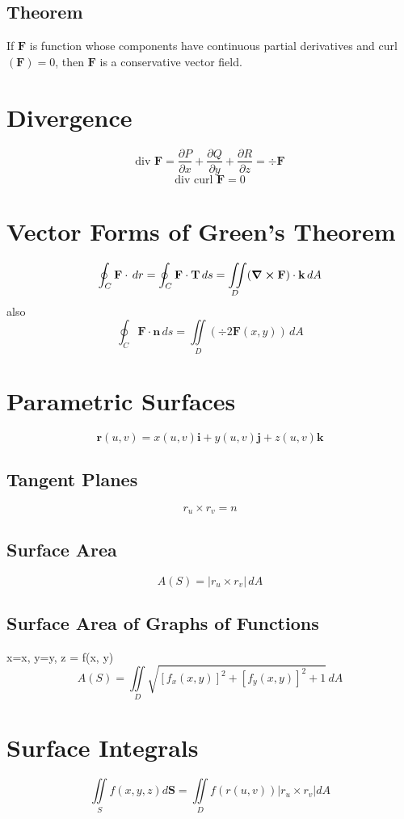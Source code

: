 \documentclass{report}
\newcommand{\pdif}[2]{ \frac{\partial #1}{ \partial #2} }
\begin{document}
\subsection*{Theorem}
If $\mathbf{F}$ is function whose components have continuous partial derivatives and curl$(\mathbf{F}) = 0$, then $\mathbf{F}$ is a conservative vector field.

\section{Divergence}
$$
\text{div } \mathbf{F} =
\pdif{P}{x} +
\pdif{Q}{y} +
\pdif{R}{z} =
\div \mathbf{F}
$$
$$
\text{div curl } \mathbf{F} = 0
$$


\section{Vector Forms of Green's Theorem}
$$
\oint_C \mathbf{F} \cdot \,dr = \oint_C \mathbf{F} \cdot \mathbf{T} \,ds = \iint \limits_D (\curl \mathbf{F}) \cdot \mathbf{k} \,dA
$$
also
$$
\oint_C \mathbf{F \cdot n} \,ds = \iint \limits_D (\div2 \mathbf{F}(x, y)) \,dA
$$


\section{Parametric Surfaces}
$$
\mathbf{r}(u, v) = x(u, v) \mathbf{i} + y(u, v) \mathbf{j} + z(u, v) \mathbf{k}
$$

\subsection{Tangent Planes}
$$
r_u \times r_v = n
$$

\subsection{Surface Area}
$$
A(S) = |r_u \times r_v| \, dA
$$
\subsection*{Surface Area of Graphs of Functions}
x=x, y=y, z = f(x, y)
$$
A(S) = \iint \limits_D \sqrt{[f_x(x, y)]^2 + [f_y(x, y)]^2 + 1} \,dA
$$

\section{Surface Integrals}
$$
\iint \limits_S f(x, y, z) d\mathbf{S} = \iint \limits_D f(r(u, v)) |r_u \times r_v | dA
$$
\end{document}
